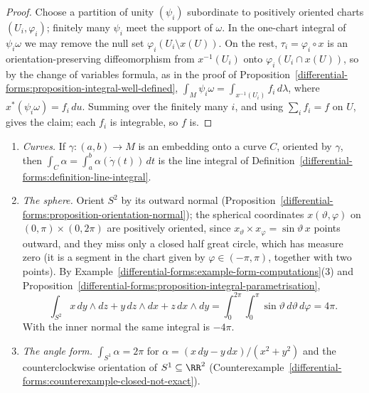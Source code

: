 \begin{proof}
Choose a partition of unity $(\psi_i)$ subordinate to positively oriented charts $(U_i, \varphi_i)$; finitely many $\psi_i$ meet the support of $\omega$. In the one-chart integral of $\psi_i\omega$ we may
remove the null set $\varphi_i(U_i \setminus x(U))$. On the rest, $\tau_i = \varphi_i \circ x$ is an orientation-preserving diffeomorphism from $x^{-1}(U_i)$ onto $\varphi_i(U_i \cap x(U))$, so by the
change of variables formula, as in the proof of Proposition~\ref{differential-forms:proposition-integral-well-defined}, $\int_M\psi_i\omega = \int_{x^{-1}(U_i)}f_i\,d\lambda$, where
$x^*(\psi_i\omega) = f_i\,du$. Summing over the finitely many $i$, and using $\sum_if_i = f$ on $U$, gives the claim; each $f_i$ is integrable, so $f$ is.
\end{proof}

\begin{example}\label{differential-forms:example-integrals}
\begin{enumerate}
\item \emph{Curves.} If $\gamma \colon (a, b) \to M$ is an embedding onto a curve $C$, oriented by $\gamma$, then $\int_C\alpha = \int_a^b\alpha(\dot\gamma(t))\,dt$ is the line integral of
Definition~\ref{differential-forms:definition-line-integral}.
\item \emph{The sphere.} Orient $S^2$ by its outward normal (Proposition~\ref{differential-forms:proposition-orientation-normal}); the spherical coordinates
$x(\vartheta, \varphi)$ on $(0, \pi) \times (0, 2\pi)$ are positively oriented, since $x_\vartheta \times x_\varphi = \sin\vartheta\,x$ points outward, and they miss only a closed half great
circle, which has measure zero (it is a segment in the chart given by $\varphi \in (-\pi, \pi)$, together with two points). By
Example~\ref{differential-forms:example-form-computations}(3) and Proposition~\ref{differential-forms:proposition-integral-parametrisation},
\[
\int_{S^2}x\,dy \wedge dz + y\,dz \wedge dx + z\,dx \wedge dy = \int_0^{2\pi}\int_0^\pi\sin\vartheta\,d\vartheta\,d\varphi = 4\pi .
\]
With the inner normal the same integral is $-4\pi$.
\item \emph{The angle form.} $\int_{S^1}\alpha = 2\pi$ for $\alpha = (x\,dy - y\,dx)/(x^2 + y^2)$ and the counterclockwise orientation of $S^1 \subseteq \RR^2$
(Counterexample~\ref{differential-forms:counterexample-closed-not-exact}).
\end{enumerate}
\end{example}

